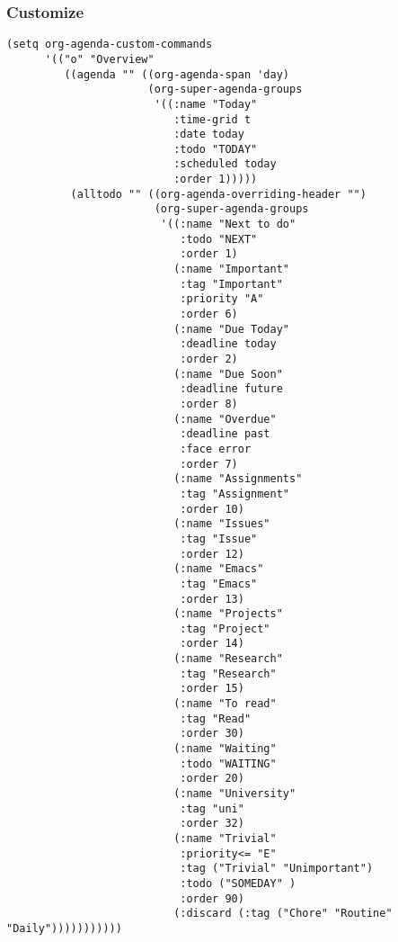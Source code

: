\documentclass[c]{article}
\theoremstyle{plain}%
\theoremstyle{definition}
\theoremstyle{remark}
\begin{document}
\subsubsection{Customize}
\label{sec:org8ac73b3}
\begin{verbatim}
(setq org-agenda-custom-commands
      '(("o" "Overview"
         ((agenda "" ((org-agenda-span 'day)
                      (org-super-agenda-groups
                       '((:name "Today"
                          :time-grid t
                          :date today
                          :todo "TODAY"
                          :scheduled today
                          :order 1)))))
          (alltodo "" ((org-agenda-overriding-header "")
                       (org-super-agenda-groups
                        '((:name "Next to do"
                           :todo "NEXT"
                           :order 1)
                          (:name "Important"
                           :tag "Important"
                           :priority "A"
                           :order 6)
                          (:name "Due Today"
                           :deadline today
                           :order 2)
                          (:name "Due Soon"
                           :deadline future
                           :order 8)
                          (:name "Overdue"
                           :deadline past
                           :face error
                           :order 7)
                          (:name "Assignments"
                           :tag "Assignment"
                           :order 10)
                          (:name "Issues"
                           :tag "Issue"
                           :order 12)
                          (:name "Emacs"
                           :tag "Emacs"
                           :order 13)
                          (:name "Projects"
                           :tag "Project"
                           :order 14)
                          (:name "Research"
                           :tag "Research"
                           :order 15)
                          (:name "To read"
                           :tag "Read"
                           :order 30)
                          (:name "Waiting"
                           :todo "WAITING"
                           :order 20)
                          (:name "University"
                           :tag "uni"
                           :order 32)
                          (:name "Trivial"
                           :priority<= "E"
                           :tag ("Trivial" "Unimportant")
                           :todo ("SOMEDAY" )
                           :order 90)
                          (:discard (:tag ("Chore" "Routine" "Daily")))))))))))
\end{verbatim}
\end{document}
